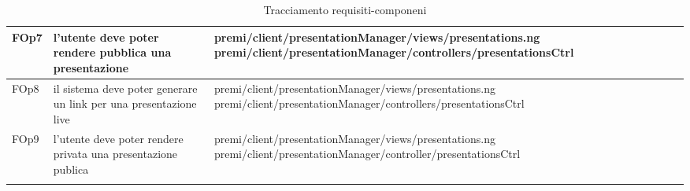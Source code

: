 \begin{longtable}{|l|p{5cm}|p{7cm}|}
\hline
FOp7 & l'utente deve poter rendere pubblica una presentazione & \hspace{0pt}premi/client/presentationManager/views/presentations.ng \linebreak \linebreak premi/client/presentationManager/controllers/presentationsCtrl \\
\hline
FOp8 & il sistema deve poter generare un link per una presentazione live & \hspace{0pt}premi/client/presentationManager/views/presentations.ng \linebreak \linebreak premi/client/presentationManager/controllers/presentationsCtrl \\
\hline
FOp9 & l'utente deve poter rendere privata una presentazione publica & \hspace{0pt}premi/client/presentationManager/views/presentations.ng \linebreak \linebreak premi/client/presentationManager/controller/presentationsCtrl \\
\hline
\caption{Tracciamento requisiti-componeni}
\end{longtable}